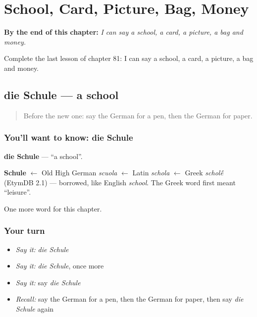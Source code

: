 
\chapter{School, Card, Picture, Bag, Money}
\label{ch:ge-school-card-picture-bag-money}

\begin{chapteropening}
\textbf{By the end of this chapter:} \emph{I can say a school, a card, a picture, a bag and money.}

Complete the last lesson of chapter 81: I can say a school, a card, a picture, a bag and money.
\end{chapteropening}

\section[die Schule]{die Schule — a school}

\label{lesson:GE-C81-schule}



\begin{quote}
Before the new one: say the German for a pen, then the German for paper.
\end{quote}

\subsection*{You'll want to know: die Schule}
\textbf{die Schule} — \textquotedblleft{}a school\textquotedblright{}.

\begin{cousinweb}
\textbf{Schule} $\leftarrow$ Old High German \emph{scuola} $\leftarrow$ Latin \emph{schola} $\leftarrow$ Greek \emph{schol\'{\={e}}} (EtymDB 2.1) — borrowed, like English \emph{school}. The Greek word first meant \textquotedblleft{}leisure\textquotedblright{}.
\end{cousinweb}

\begin{grammarlens}[title={What you've built}]
One more word for this chapter.
\end{grammarlens}

\subsection*{Your turn}
\begin{itemize}
\raggedright
  \item \emph{Say it:} \emph{die Schule}
  \item \emph{Say it:} \emph{die Schule}, once more
  \item \emph{Say it:} say \emph{die Schule}
  \item \emph{Recall:} say the German for a pen, then the German for paper, then say \emph{die Schule} again
\end{itemize}

